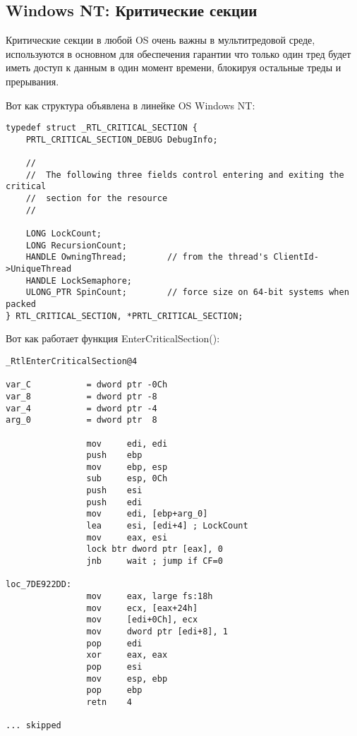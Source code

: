 \subsection{Windows NT: Критические секции}

\label{critical_sections}

Критические секции в любой \ac{OS} очень важны в мультитредовой среде, используются в основном
для обеспечения гарантии что только один тред будет иметь доступ к данным в один момент времени,
блокируя остальные треды и прерывания.

\par
Вот как структура  объявлена в линейке OS \gls{Windows NT}:

\begin{lstlisting}[caption=(Windows Research Kernel v1.2) public/sdk/inc/nturtl.h,style=customc]
typedef struct _RTL_CRITICAL_SECTION {
    PRTL_CRITICAL_SECTION_DEBUG DebugInfo;

    //
    //  The following three fields control entering and exiting the critical
    //  section for the resource
    //

    LONG LockCount;
    LONG RecursionCount;
    HANDLE OwningThread;        // from the thread's ClientId->UniqueThread
    HANDLE LockSemaphore;
    ULONG_PTR SpinCount;        // force size on 64-bit systems when packed
} RTL_CRITICAL_SECTION, *PRTL_CRITICAL_SECTION;
\end{lstlisting}

Вот как работает функция EnterCriticalSection():

\begin{lstlisting}[caption=Windows 2008/ntdll.dll/x86 (begin),style=customasmx86]
_RtlEnterCriticalSection@4

var_C           = dword ptr -0Ch
var_8           = dword ptr -8
var_4           = dword ptr -4
arg_0           = dword ptr  8

                mov     edi, edi
                push    ebp
                mov     ebp, esp
                sub     esp, 0Ch
                push    esi
                push    edi
                mov     edi, [ebp+arg_0]
                lea     esi, [edi+4] ; LockCount
                mov     eax, esi
                lock btr dword ptr [eax], 0
                jnb     wait ; jump if CF=0

loc_7DE922DD:
                mov     eax, large fs:18h
                mov     ecx, [eax+24h]
                mov     [edi+0Ch], ecx
                mov     dword ptr [edi+8], 1
                pop     edi
                xor     eax, eax
                pop     esi
                mov     esp, ebp
                pop     ebp
                retn    4

... skipped
\end{lstlisting}


